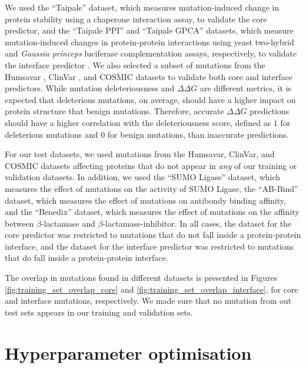 We used the ``Taipale'' dataset, which measures mutation-induced change in protein stability using a chaperone interaction assay, to validate the core predictor, and the ``Taipale PPI'' and ``Taipale GPCA'' datasets, which measure mutation-induced changes in protein-protein interactions using yeast two-hybrid and \textit{Gaussia princeps} luciferase complementation assays, respectively, to validate the interface predictor \cite{sahni_widespread_2015}. We also selected a subset of mutations from the Humsavar \cite{consortium_uniprot:_2015}, ClinVar \cite{landrum_clinvar:_2016}, and COSMIC \cite{forbes_cosmic:_2015} datasets to validate both core and interface predictors. While mutation deleteriousness and $\Delta \Delta G$ are different metrics, it is expected that deleterious mutations, on average, should have a higher impact on protein structure that benign mutations. Therefore, accurate $\Delta \Delta G$ predictions should have a higher correlation with the deleteriousness score, defined as $1$ for deleterious mutations and $0$ for benign mutations, than inaccurate predictions.

For our test datasets, we used mutations from the Humsavar, ClinVar, and COSMIC datasets affecting proteins that do not appear in \textit{any} of our training or validation datasets. In addition, we used the ``SUMO Ligase'' dataset, which measures the effect of mutations on the activity of SUMO Ligase, the ``AB-Bind'' dataset, which measures the effect of mutations on antibondy binding affinity, and the ``Benedix'' dataset, which measures the effect of mutations on the affinity between $\beta$-lactamase and $\beta$-lactamase-inhibitor. In all cases, the dataset for the core predictor was restricted to mutations that do not fall inside a protein-protein interface, and the dataset for the interface predictor was restricted to mutations that do fall inside a protein-protein interface.

The overlap in mutations found in different datasets is presented in Figures \ref{fig:training_set_overlap_core} and \ref{fig:training_set_overlap_interface}, for core and interface mutations, respectively. We made sure that no mutation from out test sets appears in our training and validation sets.




\clearpage
\section{Hyperparameter optimisation} \label{sec:gridsearch}

